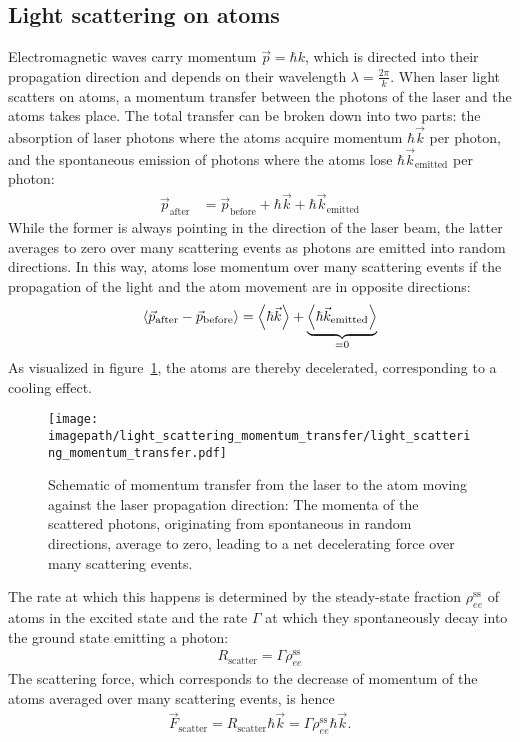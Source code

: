 \subsection*{Light scattering on atoms}
Electromagnetic waves carry momentum $\vec p = \hbar k$, which is directed into their propagation direction and depends on their wavelength $\lambda = \frac{2\pi}{k}$. When laser light scatters on atoms, a momentum transfer between the photons of the laser and the atoms takes place. The total transfer can be broken down into two parts: the absorption of laser photons where the atoms acquire momentum $\hbar \vec k$ per photon, and the spontaneous emission of photons where the atoms lose $\hbar \vec k_\text{emitted}$ per photon:
\begin{align}
    \vec p_\text{after} &= \vec p_\text{before} + \hbar \vec k + \hbar \vec k_\text{emitted}
\end{align}
While the former is always pointing in the direction of the laser beam, the latter averages to zero over many scattering events as photons are emitted into random directions. In this way, atoms lose momentum over many scattering events if the propagation of the light and the atom movement are in opposite directions:
\begin{align}
    \Braket{\vec p_\text{after} - \vec p_\text{before}} = \Braket{\hbar \vec k} + \underbrace{\Braket{\hbar \vec k_\text{emitted}}}_{=0}
\end{align}
As visualized in figure~\ref{fig:light_scattering_momentum_transfer}, the atoms are thereby decelerated, corresponding to a cooling effect.

\begin{figure}    
    \centering
    \texttt{[image: \\imagepath/light\_scattering\_momentum\_transfer/light\_scattering\_momentum\_transfer.pdf]}
    \caption{Schematic of momentum transfer from the laser to the atom moving against the laser propagation direction: The momenta of the scattered photons, originating from spontaneous in random directions, average to zero, leading to a net decelerating force over many scattering events.}
    \label{fig:light_scattering_momentum_transfer}
\end{figure}

The rate at which this happens is determined by the steady-state fraction $\rho_{ee}^\text{ss}$ of atoms in the excited state and the rate $\Gamma$ at which they spontaneously decay into the ground state emitting a photon:
\begin{align}
    R_\text{scatter} = \Gamma \rho_{ee}^\text{ss}
\end{align}
The scattering force, which corresponds to the decrease of momentum of the atoms averaged over many scattering events, is hence
\begin{align}
    \vec F_\text{scatter} = R_\text{scatter} \hbar \vec k = \Gamma \rho_{ee}^\text{ss} \hbar \vec k.
\end{align}

